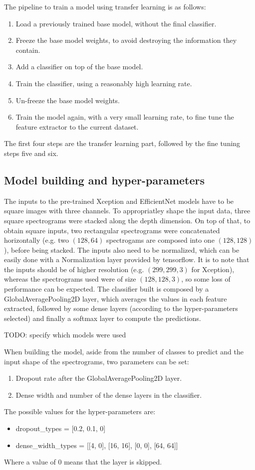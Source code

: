 The pipeline to train a model using transfer learning is as follows:
\begin{enumerate}
    \item Load a previously trained base model, without the final classifier.
    \item Freeze the base model weights, to avoid destroying the information they
        contain.
    \item Add a classifier on top of the base model.
    \item Train the classifier, using a reasonably high learning rate.
    \item Un-freeze the base model weights.
    \item Train the model again, with a very small learning rate, to fine tune
        the feature extractor to the current dataset.
\end{enumerate}

The first four steps are the transfer learning part, followed by the fine
tuning steps five and six.

\subsection{Model building and hyper-parameters}

The inputs to the pre-trained Xception and EfficientNet models have to be
square images with three channels.
To appropriatley shape the input data, three square spectrograms were stacked
along the depth dimension.
On top of that, to obtain square inputs, two rectangular spectrograms were
concatenated horizontally (e.g. two $\left( 128, 64 \right)$ spectrogams are
composed into one $\left( 128, 128 \right)$), before being stacked.
The inputs also need to be normalized, which can be easily done with a
Normalization layer provided by tensorflow.
It is to note that the inputs should be of higher resolution (e.g. $\left( 299,
299, 3 \right)$ for Xception), whereas the spectrograms used were of size
$\left( 128, 128, 3 \right)$, so some loss of performance can be expected.
The classifier built is composed by a GlobalAveragePooling2D layer, which
averages the values in each feature extracted, followed by some dense layers
(according to the hyper-parameters selected) and finally a softmax layer to
compute the predictions.

TODO: specify which models were used

When building the model, aside from the number of classes to predict and the
input shape of the spectrograms, two parameters can be set:
\begin{enumerate}
    \item Dropout rate after the GlobalAveragePooling2D layer.
    \item Dense width and number of the dense layers in the classifier.
\end{enumerate}
The possible values for the hyper-parameters are:
\begin{itemize}
    \item dropout\_types = [0.2, 0.1, 0]
    \item dense\_width\_types = [[4, 0], [16, 16], [0, 0], [64, 64]]
\end{itemize}
Where a value of $0$ means that the layer is skipped.

